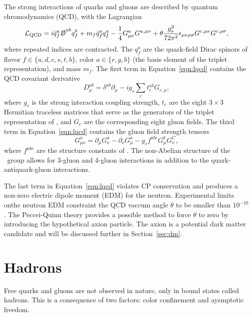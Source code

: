 The strong interactions of quarks and gluons are described by quantum chromodynamics (QCD), with the Lagrangian
\begin{equation}
  \label{eqn:lqcd}
  \mathcal{L}_{\text{QCD}} = i \bar q_f^a \slashed D^{ab} q_f^b + m_f \bar q_f^a q_f^a - \frac{1}{4} G_{\mu\nu}^a G^{a,\mu\nu} + \theta \frac{g_s^2}{72\pi^2} \epsilon_{\mu\nu\rho\sigma} G^{c,\mu\nu} G^{c, \rho\sigma},
\end{equation}
where repeated indices are contracted.
The $q_f^a$ are the quark-field Dirac spinors of flavor $f \in \{u,d,c,s,t,b\}$, color $a \in \{r,g,b\}$ (the basis element of the triplet representation), and mass $m_f$.
The first term in Equation~\ref{eqn:lqcd} contains the QCD covariant derivative
\begin{equation}
  D_{\mu}^{ab} = \delta^{ab} \partial_\mu - i g_s \sum_{c} t_c^{ab} G_{c,\mu},
\end{equation}
where $g_s$ is the strong interaction coupling strength, $t_c$ are the eight $3\times3$ Hermitian traceless matrices that serve as the generators of the triplet representation of \suthree, and $G_c$ are the corresponding eight gluon fields.
The third term in Equation~\ref{eqn:lqcd} contains the gluon field strength tensors
\begin{equation}
  G_{\mu\nu}^a = \partial_\mu G_\nu^a - \partial_\nu G_\mu^a - g_s f^{abc} G_\mu^b G_\nu^C,
\end{equation}
where $f^{abc}$ are the structure constants of \suthree.
The non-Abelian structure of the \suthree\ group allows for 3-gluon and 4-gluon interactions in addition to the quark-antiquark-gluon interactions.

The last term in Equation~\ref{eqn:lqcd} violates CP conservation and produces a non-zero electric dipole moment (EDM) for the neutron.
Experimental limits onthe neutron EDM constraint the QCD vaccum angle $\theta$ to be smaller than $10^{-10}$.
The Peccei-Quinn theory provides a possible method to force $\theta$ to zero by introducing the hypothetical axion particle. The axion is a potential dark matter candidate and will be discussed further in Section~\ref{sec:dm}.

\section{Hadrons}
\label{sec:hadrons}

Free quarks and gluons are not observed in nature, only in bound states called hadrons.
This is a consequence of two factors: color confinement and aysmptotic freedom.

